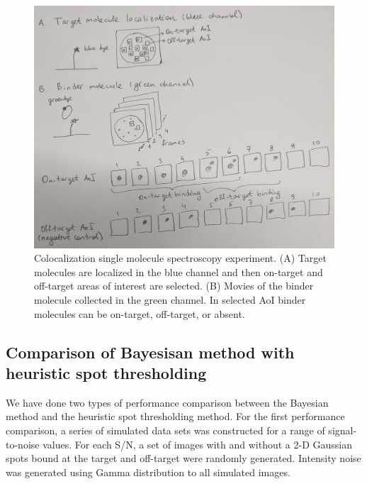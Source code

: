 \begin{figure}
\includegraphics[width=\linewidth]{figures/figure1.jpg}
\caption{Colocalization single molecule spectroscopy experiment. (A) Target molecules are localized in the blue channel and then on-target and off-target areas of interest are selected. (B) Movies of the binder molecule collected in the green channel. In selected AoI binder molecules can be on-target, off-target, or absent.}
\label{fig:view}
\end{figure}

\subsection{Comparison of Bayesisan method with heuristic spot thresholding}

We have done two types of performance comparison between the Bayesian method and the heuristic spot thresholding method. For the first performance comparison, a series of simulated data sets was constructed for a range of signal-to-noise values. For each S/N, a set of images with and without a 2-D Gaussian spots bound at the target and off-target were randomly generated. Intensity noise was generated using Gamma distribution to all simulated images.

